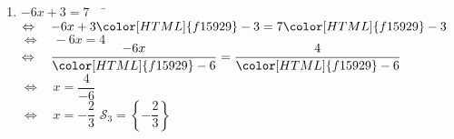 \documentclass[a4paper,11pt,exos]{nsi} %
\begin{document}
\begin{enumerate}
            
            \item 	\begin{tabbing}
                $ -6x+3=7 \quad$		\=	$\Leftrightarrow\quad -6x+3{\color[HTML]{f15929}-3}=7{\color[HTML]{f15929}-3} $\\
                \>	$\Leftrightarrow\quad  -6x=4 $\\
                \>	$\Leftrightarrow\quad	\dfrac{-6x}{\color[HTML]{f15929}-6}=\dfrac{4}{\color[HTML]{f15929}-6}$\\
                \>	$\Leftrightarrow\quad	x=\dfrac{4}{-6} $\\[.5em]
                \>	$\Leftrightarrow\quad	x=-\dfrac{2}{3}$ \hspace{4cm} $\mathcal{S}_3=\left\{ -\dfrac{2}{3} \right\}$
            \end{tabbing}
            
        \end{enumerate}
    
    
    
\end{document}
